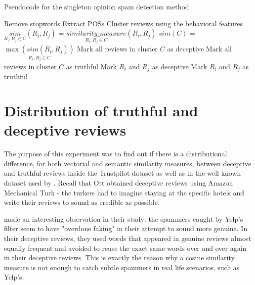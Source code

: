 \begin{algorithm}[!ht]
\caption*{Pseudocode for the singleton opinion spam detection method}
\label{alg:singleton}
\begin{algorithmic}[1]
	\State Remove stopwords
  	\State Extract POSs
  	\EndFor
  	\State Cluster reviews using the behavioral features
		\State $\underset{R_i, R_j \in C}{sim}(R_i, R_j)$ = $\underset{R_i, R_j \in C}{similarity\_measure}(R_i, R_j)$
	\newline{}
		\EndFor
		\State ${sim(C)}$ = $\underset{R_i, R_j\in C}{\max(sim(R_i, R_j))}$
			\newline{}
				\State Mark all reviews in cluster $C$ as deceptive
			\Else 
				\State Mark all reviews in cluster $C$ as truthful
			\EndIf
			\newline{}
				\State Mark $R_i$ and $R_j$ as deceptive
			\Else 
				\State Mark $R_i$ and $R_j$ as truthful
			\EndIf
		\EndFor
	\EndFor
\end{algorithmic}
\end{algorithm}

\clearpage 

\section{Distribution of truthful and deceptive reviews}\label{section:distribution-reviews}

The purpose of this experiment was to find out if there is a distributional difference, for both vectorial and semantic similarity measures, between deceptive and truthful reviews inside the Trustpilot dataset as well as in the well known dataset used by \citet{Ott2011}. Recall that Ott obtained deceptive reviews using Amazon Mechanical Turk - the turkers had to imagine staying at the specific hotels and write their reviews to sound as credible as possible. 

\citet{Mukherjee2013a} made an interesting observation in their study: the spammers caught by Yelp's filter seem to have "overdone faking" in their attempt to sound more genuine. In their deceptive reviews, they used words that appeared in genuine reviews almost equally frequent and avoided to reuse the exact same words over and over again in their deceptive reviews. This is exactly the reason why a cosine similarity measure is not enough to catch subtle spammers in real life scenarios, such as Yelp's. 

